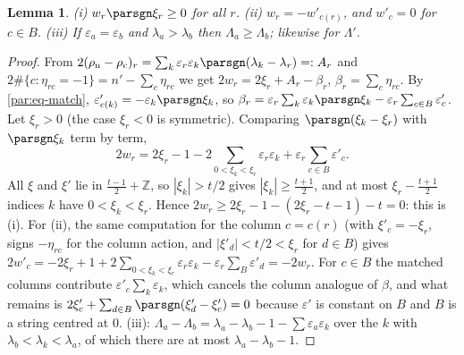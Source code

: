 \documentclass[10pt]{amsart}
\newtheorem{lemma}[theorem]{Lemma}
\theoremstyle{definition}
\theoremstyle{remark}
\newcommand{\Z}{\mathbb Z}
\begin{document}
\begin{lemma}\label{par:relw}
\textup{(i)} $w_r\parsgn\xi_r\ge0$ for all $r$. \textup{(ii)} $w_r=-w'_{c(r)}$, and $w'_c=0$ for $c\in B$.
\textup{(iii)} If $\varepsilon_a=\varepsilon_b$ and $\lambda_a>\lambda_b$ then $\Lambda_a\ge\Lambda_b$;
likewise for $\Lambda'$.
\end{lemma}
\begin{proof}
From $2(\rho_{\mathrm n}-\rho_{\mathrm c})_r=\sum_k\varepsilon_r\varepsilon_k\parsgn(\lambda_k-\lambda_r)=:A_r$
and $2\#\{c:\eta_{rc}=-1\}=n'-\sum_c\eta_{rc}$ we get $2w_r=2\xi_r+A_r-\beta_r$, $\beta_r=\sum_c\eta_{rc}$.
By \eqref{par:eq-match}, $\varepsilon'_{c(k)}=-\varepsilon_k\parsgn\xi_k$, so
$\beta_r=\varepsilon_r\sum_k\varepsilon_k\parsgn\xi_k-\varepsilon_r\sum_{c\in B}\varepsilon'_c$. Let $\xi_r>0$
(the case $\xi_r<0$ is symmetric). Comparing $\parsgn(\xi_k-\xi_r)$ with $\parsgn\xi_k$ term by term,
\[
2w_r=2\xi_r-1-2\!\!\sum_{0<\xi_k<\xi_r}\!\!\varepsilon_r\varepsilon_k+\varepsilon_r\sum_{c\in B}\varepsilon'_c .
\]
All $\xi$ and $\xi'$ lie in $\tfrac{t-1}2+\Z$, so $|\xi_k|>t/2$ gives $|\xi_k|\ge\tfrac{t+1}2$, and at most
$\xi_r-\tfrac{t+1}2$ indices $k$ have $0<\xi_k<\xi_r$. Hence $2w_r\ge2\xi_r-1-(2\xi_r-t-1)-t=0$: this is
(i). For (ii), the same computation for the column $c=c(r)$ (with $\xi'_c=-\xi_r$, signs
$-\eta_{rc}$ for the column action, and $|\xi'_d|<t/2<\xi_r$ for $d\in B$) gives
$2w'_c=-2\xi_r+1+2\sum_{0<\xi_k<\xi_r}\varepsilon_r\varepsilon_k-\varepsilon_r\sum_{B}\varepsilon'_d=-2w_r$. For
$c\in B$ the matched columns contribute $\varepsilon'_c\sum_k\varepsilon_k$, which cancels the column
analogue of $\beta$, and what remains is $2\xi'_c+\sum_{d\in B}\parsgn(\xi'_d-\xi'_c)=0$ because
$\varepsilon'$ is constant on $B$ and $B$ is a string centred at $0$. (iii): $\Lambda_a-\Lambda_b=
\lambda_a-\lambda_b-1-\sum\varepsilon_a\varepsilon_k$ over the $k$ with $\lambda_b<\lambda_k<\lambda_a$, of
which there are at most $\lambda_a-\lambda_b-1$.
\end{proof}
\end{document}
